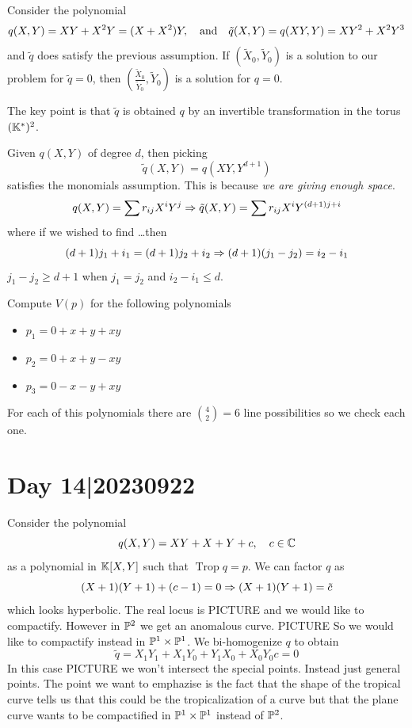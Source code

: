 \documentclass[12pt]{memoir}
\DeclareMathOperator{\Trop}{Trop}
\begin{document}
\begin{Ex}
    Consider the polynomial 
    $$q(X,Y)=XY+X^2Y=(X+X^2)Y,\quad\text{and}\quad\tilde{q}(X,Y)=q(XY,Y)=XY^2+X^2Y^3$$
    and $\tilde{q}$ does satisfy the previous assumption. If $(\tilde{X}_0,\tilde Y_0)$ is a solution to our problem for $\tilde{q}=0$, then $\left(\frac{\tilde{X}_0}{\tilde Y_0},\tilde Y_0\right)$ is a solution for $q=0$.\par 
    The key point is that $\tilde q$ is obtained $q$ by an invertible transformation in the torus $(\mathbb{K}^\ast)^2$.
\end{Ex}

\begin{ptcb}
Given $q(X,Y)$ of degree $d$, then picking 
$$\tilde{q}(X,Y)=q(XY,Y^{d+1})$$
satisfies the monomials assumption. This is because \emph{we are giving enough space}.
$$q(X,Y)=\sum r_{ij}X^iY^j\Rightarrow \tilde{q}(X,Y)=\sum r_{ij}X^iY^{(d+1)j+i}$$
where if we wished to find \dots then 
$$(d+1)j_1+i_1=(d+1)j_2+i_2\Rightarrow (d+1)(j_1-j_2)=i_2-i_1$$
$j_1-j_2\geq d+1$ when $j_1=j_2$ and $i_2-i_1\leq d$.
\end{ptcb}

\begin{Ex}
    Compute $V(p)$ for the following polynomials
    \begin{itemize}
        \item $p_1=0+x+y+xy$
        \item $p_2=0+x+y-xy$
        \item $p_3=0-x-y+xy$
    \end{itemize}
    For each of this polynomials there are $\binom{4}{2}=6$ line possibilities so we check each one.
\end{Ex}

\section{Day 14|20230922}

Consider the polynomial 
$$q(X,Y)=XY+X+Y+c,\quad c\in\mathbb{C}$$
as a polynomial in $\mathbb{K}[X,Y]$ such that $\Trop q=p$. We can factor $q$ as 
$$(X+1)(Y+1)+(c-1)=0\Rightarrow(X+1)(Y+1)=\tilde{c}$$
which looks hyperbolic. The real locus is PICTURE and we would like to compactify. However in $\mathbb{P}^2$ we get an anomalous curve. PICTURE So we would like to compactify instead in $\mathbb{P}^1\times\mathbb{P}^1$.  We bi-homogenize $q$ to obtain 
$$\tilde{q}=X_1Y_1+X_1Y_0+Y_1X_0+X_0Y_0c=0$$ 
In this case PICTURE we won't intersect the special points. Instead just general points. The point we want to emphazise is the fact that the shape of the tropical curve tells us that this could be the tropicalization of  a curve but that the plane curve wants to be compactified in $\mathbb{P}^1\times\mathbb{P}^1$ instead of $\mathbb{P}^2$.
\end{document}
